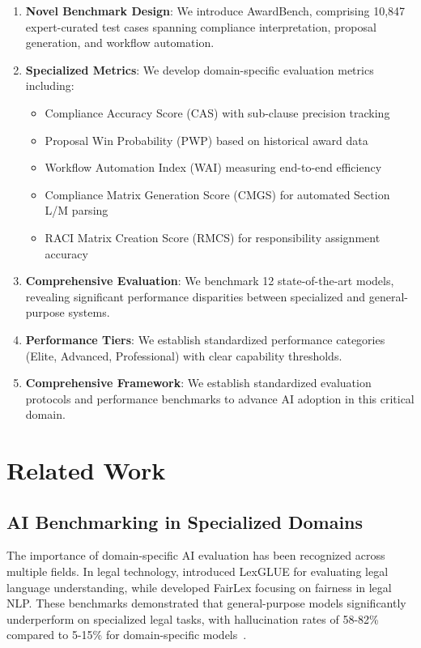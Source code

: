 \documentclass[11pt,a4paper]{article}
\begin{document}
\begin{enumerate}
    \item \textbf{Novel Benchmark Design}: We introduce AwardBench, comprising 10,847 expert-curated test cases spanning compliance interpretation, proposal generation, and workflow automation.
    
    \item \textbf{Specialized Metrics}: We develop domain-specific evaluation metrics including:
    \begin{itemize}
        \item Compliance Accuracy Score (CAS) with sub-clause precision tracking
        \item Proposal Win Probability (PWP) based on historical award data
        \item Workflow Automation Index (WAI) measuring end-to-end efficiency
        \item Compliance Matrix Generation Score (CMGS) for automated Section L/M parsing
        \item RACI Matrix Creation Score (RMCS) for responsibility assignment accuracy
    \end{itemize}
    
    \item \textbf{Comprehensive Evaluation}: We benchmark 12 state-of-the-art models, revealing significant performance disparities between specialized and general-purpose systems.
    
    \item \textbf{Performance Tiers}: We establish standardized performance categories (Elite, Advanced, Professional) with clear capability thresholds.
    
    \item \textbf{Comprehensive Framework}: We establish standardized evaluation protocols and performance benchmarks to advance AI adoption in this critical domain.
\end{enumerate}

\section{Related Work}

\subsection{AI Benchmarking in Specialized Domains}

The importance of domain-specific AI evaluation has been recognized across multiple fields. In legal technology, \citet{katz2024lexglue} introduced LexGLUE for evaluating legal language understanding, while \citet{chalkidis2022fairlex} developed FairLex focusing on fairness in legal NLP. These benchmarks demonstrated that general-purpose models significantly underperform on specialized legal tasks, with hallucination rates of 58-82\% compared to 5-15\% for domain-specific models~\citep{thomson2024legal}.
\end{document}
